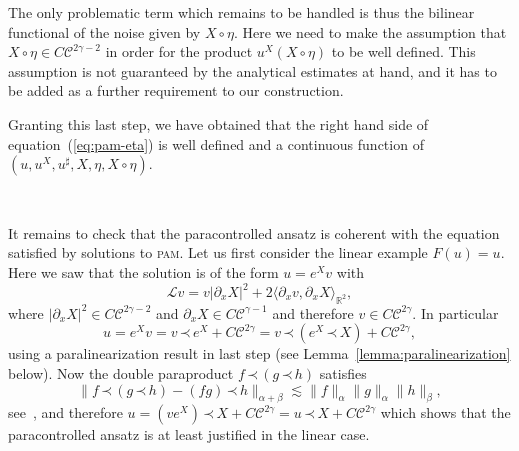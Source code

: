\documentclass[a4paper,11pt]{article}
\newcommand{\tmname}[1]{\textsc{#1}}
\newcommand{\LL}{\mathscr{L}}
\newcommand{\CC}{\mathscr{C}}
\newcommand{\lpara}{\,\mathord{\prec}\,}
\newcommand{\reso}{\,\mathord{\circ}\,}
\begin{document}
The only problematic term which remains to be handled is thus the bilinear
functional of the noise given by $X \reso \eta$. Here we need to make the
assumption that $X \reso \eta \in C \CC^{2 \gamma - 2}$ in order for the
product $u^X  (X \reso \eta)$ to be well defined. This assumption is not
guaranteed by the analytical estimates at hand, and it has to be added as a
further requirement to our construction.

Granting this last step, we have obtained that the right hand side of
equation~(\ref{eq:pam-eta}) is well defined and a continuous function of $(u,
u^X, u^{\sharp}, X, \eta, X \reso \eta)$.

\

It remains to check that the paracontrolled ansatz is coherent with the
equation satisfied by solutions to {\tmname{pam}}. Let us first consider the
linear example $F (u) = u$. Here we saw that the solution is of the form $u =
e^X v$ with
\[ \LL v = v | \partial_x X |^2 + 2 \langle \partial_x v, \partial_x X
   \rangle_{\mathbb{R}^2}, \]
where $| \partial_x X |^2 \in C \CC^{2 \gamma - 2}$ and $\partial_x X \in C
\CC^{\gamma - 1}$ and therefore $v \in C \CC^{2 \gamma}$. In particular
\[ u = e^X v = v \lpara e^X + C \CC^{2 \gamma} = v \lpara (e^X \lpara X) + C
   \CC^{2 \gamma}, \]
using a paralinearization result in last step (see
Lemma~\ref{lemma:paralinearization} below). Now the double paraproduct $f
\lpara (g \lpara h)$ satisfies
\[ \| f \lpara (g \lpara h) - (f g) \lpara h \|_{\alpha + \beta} \lesssim \| f
   \|_{\alpha} \| g \|_{\alpha} \| h \|_{\beta}, \]
see~{\cite{Bony1981}}, and therefore $u = (v e^X) \lpara X + C \CC^{2 \gamma} =
u \lpara X + C \CC^{2 \gamma}$ which shows that the paracontrolled ansatz is at
least justified in the linear case.

\
\end{document}
